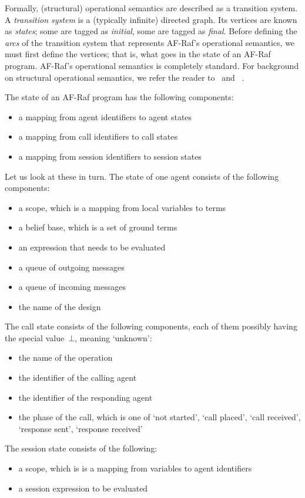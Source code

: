 \documentclass[a4paper,12pt,oneside,fleqn]{book} %
\begin{document}
Formally, (structural) operational semantics are described as a transition
system. A \emph{transition system} is a (typically infinite) directed
graph. Its vertices are known as \emph{states}; some are tagged as
\emph{initial}, some are tagged as \emph{final}. Before defining the
\emph{arcs} of the transition system that represents AF-Raf's operational
semantics, we must first define the vertices; that is, what goes in the
state of an AF-Raf program. AF-Raf's operational semantics is completely
standard. For background on structural operational
semantics, we refer the reader to~\cite[Section~5.2]{harper2012} and
~\cite{plotkin1981structural}.

The state of an AF-Raf program has the following components:
\begin{itemize}
\item a mapping from agent identifiers to agent states
\item a mapping from call identifiers to call states
\item a mapping from session identifiers to session states
\end{itemize}
Let us look at these in turn. The state of one agent consists of the
following components:
\begin{itemize}
\item a scope, which is a mapping from local variables to terms
\item a belief base, which is a set of ground terms
\item an expression that needs to be evaluated
\item a queue of outgoing messages
\item a queue of incoming messages
\item the name of the design
\end{itemize}
The call state consists of the following components, each of them possibly
having the special value~$\bot$, meaning `unknown':
\begin{itemize}
\item the name of the operation
\item the identifier of the calling agent
\item the identifier of the responding agent
\item the phase of the call, which is one of `not started', `call placed',
`call received', `response sent', `response received'
\end{itemize}
The session state consists of the following:
\begin{itemize}
\item a scope, which is is a mapping from variables to agent identifiers
\item a session expression to be evaluated
\end{itemize}
\end{document}
